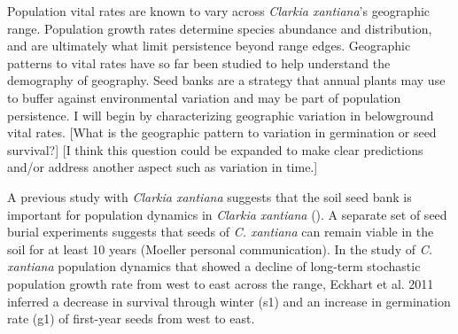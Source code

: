 \documentclass[12pt, oneside, titlepage]{article}   	%
\begin{document}


Population vital rates are known to vary across \textit{Clarkia xantiana}'s geographic range. Population growth rates determine species abundance and distribution, and are ultimately what limit persistence beyond range edges. Geographic patterns to vital rates have so far been studied to help understand the demography of geography. Seed banks are a strategy that annual plants may use to buffer against environmental variation and may be part of population persistence. I will begin by characterizing geographic variation in belowground vital rates. [What is the geographic pattern to variation in germination or seed survival?] [I think this question could be expanded to make clear predictions and/or address another aspect such as variation in time.]

A previous study with \textit{Clarkia xantiana} suggests that the soil seed bank is important for population dynamics in \textit{Clarkia xantiana} (\cite{eckhart2011}). A separate set of seed burial experiments suggests that seeds of \textit{C. xantiana} can remain viable in the soil for at least 10 years (Moeller personal communication). In the study of \textit{C. xantiana} population dynamics that showed a decline of long-term stochastic population growth rate from west to east across the range, Eckhart et al. 2011 inferred a decrease in survival through winter (s1) and an increase in germination rate (g1) of first-year seeds from west to east.
\end{document}
